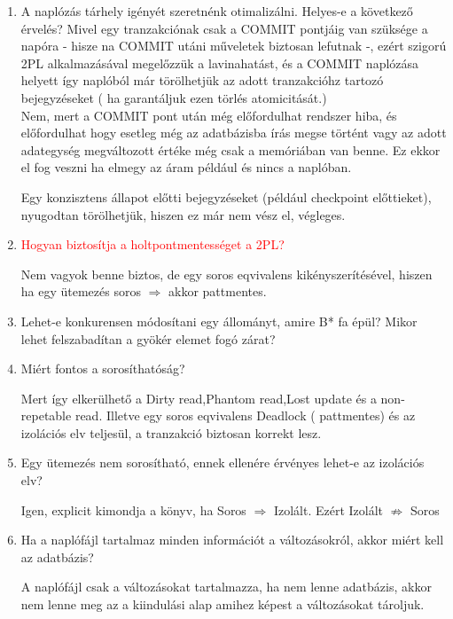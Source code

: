 	\begin{enumerate}
		\item A naplózás tárhely igényét szeretnénk otimalizálni. Helyes-e a következő érvelés? Mivel egy tranzakciónak csak a COMMIT pontjáig van szüksége a napóra - hisze na COMMIT utáni műveletek biztosan lefutnak -, ezért szigorú 2PL alkalmazásával megelőzzük a lavinahatást, és a COMMIT naplózása helyett így  naplóból már törölhetjük az adott tranzakcióhz tartozó bejegyzéseket ( ha garantáljuk ezen törlés atomicitását.)\\[-2pt]

		Nem, mert a COMMIT pont után még előfordulhat rendszer hiba, és előfordulhat hogy esetleg még az adatbázisba írás megse történt vagy az adott adategység megváltozott értéke még csak a memóriában van benne. Ez ekkor el fog veszni ha elmegy az áram például és nincs a naplóban.

		Egy konzisztens állapot előtti bejegyzéseket (például checkpoint előttieket), nyugodtan törölhetjük, hiszen ez már nem vész el, végleges.

		\item \textcolor{red}{Hogyan biztosítja a holtpontmentességet a 2PL?}

		Nem vagyok benne biztos, de egy soros eqvivalens kikényszerítésével, hiszen ha egy ütemezés soros $\Rightarrow$ akkor pattmentes.

		\item Lehet-e konkurensen módosítani egy állományt, amire B* fa épül? Mikor lehet felszabadítan a gyökér elemet fogó zárat? %

		\item Miért fontos a sorosíthatóság?

		Mert így elkerülhető a Dirty read,Phantom read,Lost update és a non-repetable read. Illetve egy soros eqvivalens Deadlock ( pattmentes) és az izolációs elv teljesül, a tranzakció biztosan korrekt lesz.

		\item Egy ütemezés nem sorosítható, ennek ellenére érvényes lehet-e az izolációs elv?

		Igen, explicit kimondja a könyv, ha Soros $\Rightarrow$ Izolált. Ezért Izolált $\nRightarrow$ Soros

		\item Ha a naplófájl tartalmaz minden információt a változásokról, akkor miért kell az adatbázis?

		A naplófájl csak a változásokat tartalmazza, ha nem lenne adatbázis, akkor nem lenne meg az a kiindulási alap amihez képest a változásokat tároljuk.


\end{enumerate}
